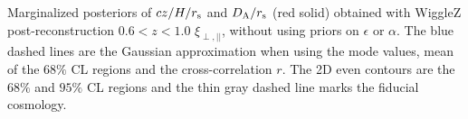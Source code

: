 \label{fig:HDA_z60_noprior} Marginalized posteriors of $cz/H/r_{\rm s}$ and $D_{\rm A}/r_{\rm s}$ (red solid) obtained with WiggleZ post-reconstruction $0.6<z<1.0$ $\xi_{\perp, ||}$, without using priors on $\epsilon$ or $\alpha$. The blue dashed lines are the Gaussian approximation when using the mode values, mean of the 68$\%$ CL regions and the cross-correlation $r$. The 2D even contours are the $68\%$ and $95\%$ CL regions and the thin gray dashed line marks the fiducial cosmology.